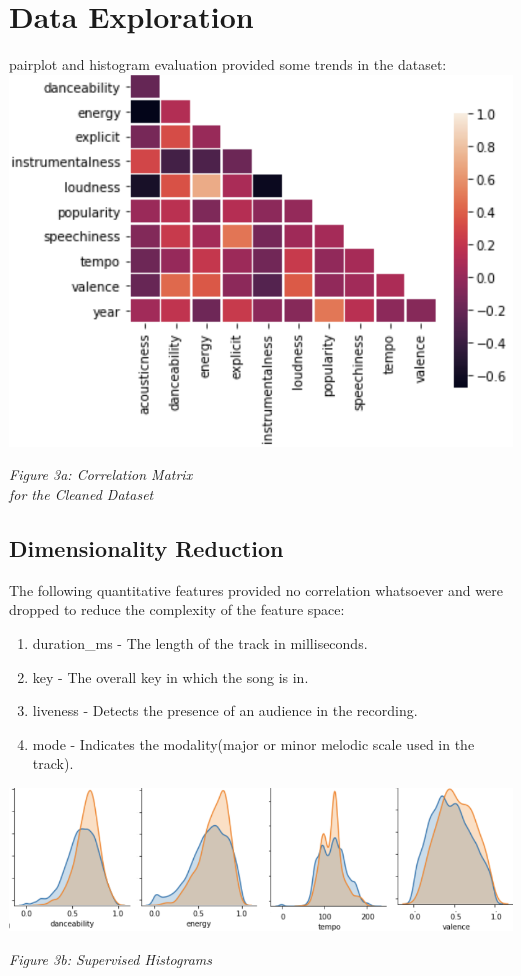 \documentclass[12pt,journal]{IEEEtran}
\begin{document}
\section{Data Exploration}
 pairplot and histogram evaluation provided some trends in the dataset:\\

\includegraphics[width=\linewidth]{ss2}
\begin{center}
	\textit{Figure 3a: Correlation Matrix \\for the Cleaned Dataset}
\end{center}

\subsection{Dimensionality Reduction}
The following quantitative features provided no correlation whatsoever and were dropped to reduce the complexity of the feature space:
\begin{enumerate}
	\item duration\_ms - The length of the track in milliseconds.
	\item key - The overall key in which the song is in.
	\item liveness - Detects the presence of an audience in the recording.
	\item mode - Indicates the modality(major or minor  melodic scale used in the track).\\
\end{enumerate}

\includegraphics[width=\linewidth]{ss3}
\begin{center}
	\textit{Figure 3b: Supervised Histograms}
\end{center}
\end{document}

